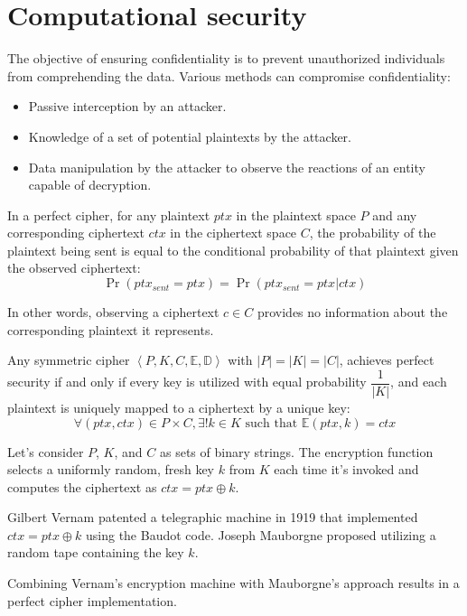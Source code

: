 \section{Computational security}

The objective of ensuring confidentiality is to prevent unauthorized individuals from comprehending the data. 
Various methods can compromise confidentiality:
\begin{itemize}
    \item Passive interception by an attacker.
    \item Knowledge of a set of potential plaintexts by the attacker.
    \item Data manipulation by the attacker to observe the reactions of an entity capable of decryption.
\end{itemize}

\begin{definition}
    In a perfect cipher, for any plaintext $ptx$ in the plaintext space $P$ and any corresponding ciphertext $ctx$ in the ciphertext space $C$, the probability of the plaintext being sent is equal to the conditional probability of that plaintext given the observed ciphertext:
    \[\Pr(ptx_{sent}=ptx)=\Pr(ptx_{sent}=ptx|ctx)\]
\end{definition}
In other words, observing a ciphertext $c \in C$ provides no information about the corresponding plaintext it represents.
\begin{theorem}[Shannon 1949]
    Any symmetric cipher $\left\langle P,K,C,\mathbb{E},\mathbb{D} \right\rangle $ with $\left\lvert P \right\rvert=\left\lvert K \right\rvert=\left\lvert C \right\rvert$, achieves perfect security if and only if every key is utilized with equal probability $\dfrac{1}{\left\lvert K\right\rvert }$, and each plaintext is uniquely mapped to a ciphertext by a unique key:
    \[\forall \left(ptx,ctx\right) \in P \times C, \exists !k \in K \text{ such that } \mathbb{E}\left(ptx,k\right)=ctx\]
\end{theorem}
\begin{example}
    Let's consider $P$, $K$, and $C$ as sets of binary strings. 
    The encryption function selects a uniformly random, fresh key $k$ from $K$ each time it's invoked and computes the ciphertext as $ctx=ptx \oplus k$.

    Gilbert Vernam patented a telegraphic machine in 1919 that implemented $ctx=ptx \oplus k$ using the Baudot code. 
    Joseph Mauborgne proposed utilizing a random tape containing the key $k$.

    Combining Vernam's encryption machine with Mauborgne's approach results in a perfect cipher implementation.
\end{example}

